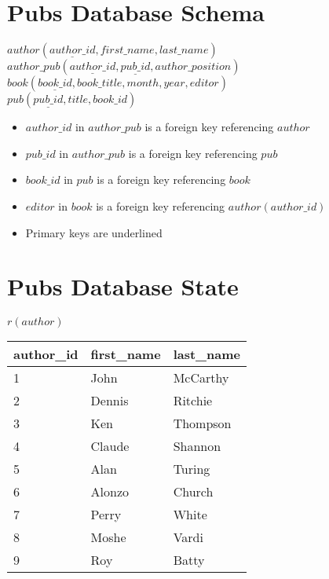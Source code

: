 \documentclass[10pt,a4paper]{exam}
\begin{document}
\marginpointname{}

\begin{figure}[H]

\section*{Pubs Database Schema}

$author(\underline{author\_id}, first\_name, last\_name)$\\

$author\_pub(\underline{author\_id}, \underline{pub\_id}, author\_position)$\\

$book(\underline{book\_id}, book\_title, month, year, editor)$\\

$pub(\underline{pub\_id}, title, book\_id)$

\begin{itemize}
\item $author\_id$ in $author\_pub$ is a foreign key referencing $author$
\item $pub\_id$ in $author\_pub$ is a foreign key referencing $pub$
\item $book\_id$ in $pub$ is a foreign key referencing $book$
\item $editor$ in $book$ is a foreign key referencing $author(author\_id)$
\item Primary keys are underlined
\end{itemize}

\section*{Pubs Database State}

\begin{multicols}{2}

$r(author)$\\
\begin{tabular}{|l|l|l|}\hline
\rowcolor{lightgray} author\_id & first\_name & last\_name \\\hline
1 & John       & McCarthy  \\\hline
2 & Dennis     & Ritchie   \\\hline
3 & Ken        & Thompson  \\\hline
4 & Claude     & Shannon   \\\hline
5 & Alan       & Turing    \\\hline
6 & Alonzo     & Church    \\\hline
7 & Perry      & White     \\\hline
8 & Moshe      & Vardi     \\\hline
9 & Roy        & Batty     \\\hline
\end{tabular}


\end{multicols}
\end{figure}
\end{document}
